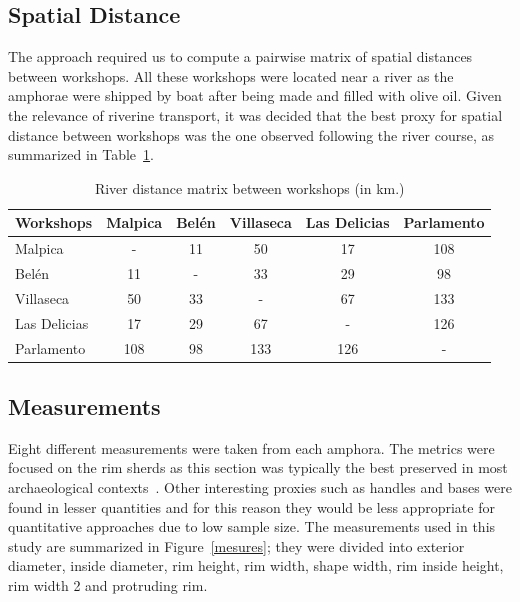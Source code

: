\documentclass[review]{elsarticle}
\begin{document}
\subsection{Spatial Distance}

The approach required us to compute a pairwise matrix of spatial distances between workshops. All these workshops were located near a river as the amphorae were shipped by boat after being made and filled with olive oil. Given the relevance of riverine transport, it was decided that the best proxy for spatial distance between workshops was the one observed following the river course, as summarized in Table~\ref{table:distances}.

\begin{table}[htp]
\centering

\begin{tabular}{lccccc}
\hline

\textbf{Workshops} & Malpica & Belén & Villaseca & Las Delicias & Parlamento \\ \hline
Malpica & - & 11 & 50 & 17 & 108 \\
Belén & 11 & - & 33 & 29 & 98 \\
Villaseca & 50 & 33 & - & 67 & 133 \\
Las Delicias & 17 & 29 & 67 & - & 126 \\
Parlamento & 108 & 98 & 133 & 126 & - \\
\hline
\end{tabular}
\caption{River distance matrix between workshops (in km.)}
\label{table:distances}
\end{table}

\subsection{Measurements}

Eight different measurements were taken from each amphora. The metrics were focused on the rim sherds as this section was typically the best preserved in most archaeological contexts~\citep{berni_millet_epigrafianforica_2008}. Other interesting proxies such as handles and bases were found in lesser quantities and for this reason they would be less appropriate for quantitative approaches due to low sample size. The measurements used in this study are summarized in Figure~\ref{mesures}; they were divided into exterior diameter, inside diameter, rim height, rim width, shape width, rim inside height, rim width 2 and protruding rim.
\end{document}
